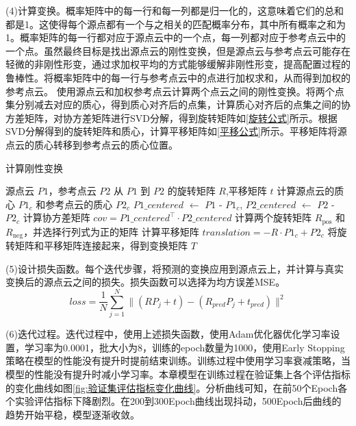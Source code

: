 (4)计算变换。概率矩阵中的每一行和每一列都是归一化的，这意味着它们的总和都是1。这使得每个源点都有一个与之相关的匹配概率分布，其中所有概率之和为1。概率矩阵的每一行都对应于源点云中的一个点，每一列都对应于参考点云中的一个点。虽然最终目标是找出源点云的刚性变换，但是源点云与参考点云可能存在轻微的非刚性形变，通过求加权平均的方式能够缓解非刚性形变，提高配置过程的鲁棒性。将概率矩阵中的每一行与参考点云中的点进行加权求和，从而得到加权的参考点云。
使用源点云和加权参考点云计算两个点云之间的刚性变换。将两个点集分别减去对应的质心，得到质心对齐后的点集，计算质心对齐后的点集之间的协方差矩阵，对协方差矩阵进行SVD分解\cite{kalman1996singularly}，得到旋转矩阵如\eqref{旋转公式}所示。根据SVD分解得到的旋转矩阵和质心，计算平移矩阵如\eqref{平移公式}所示。平移矩阵将源点云的质心转移到参考点云的质心位置。

\begin{algorithm}[htbp]
	\caption{计算刚性变换}
	\label{alg:compute_rigid_transform}
	\begin{algorithmic}[1]
		\Require 源点云 $P1$，参考点云 $P2$
		\Ensure 从 $P1$ 到 $P2$ 的旋转矩阵 $R$,平移矩阵 $t$
		\State 计算源点云的质心 $P1_c$ 和参考点云的质心 $P2_c$
		\State  $P1\_centered$ $\gets$  $P1$ -  $P1_c$, $P2\_centered$ $\gets$  $P2$ -  $P2_c$ 
		\State 计算协方差矩阵 $cov = P1\_centered^\top \cdot P2\_centered $
		\State 计算两个旋转矩阵 $R_{\text{pos}}$ 和 $R_{\text{neg}}$，并选择行列式为正的矩阵
	 \State 计算平移矩阵 $translation = -R \cdot P1_c + P2_c$
		\State 将旋转矩阵和平移矩阵连接起来，得到变换矩阵 $T$
	\end{algorithmic}
\end{algorithm}
(5)设计损失函数。每个迭代步骤，将预测的变换应用到源点云上，并计算与真实变换后的源点云之间的损失。损失函数可以选择为均方误差MSE。
\begin{equation}
	loss = \frac{1}{N}\sum_{j=1}^{N}\| (RP_j+t) - (R_{pred}P_j+t_{pred}) \|^2
\end{equation}
\par
(6)迭代过程。迭代过程中，使用上述损失函数，使用Adam优化器优化学习率设置，学习率为0.0001，批大小为8，训练的epoch数量为1000，使用Early Stopping策略在模型的性能没有提升时提前结束训练。训练过程中使用学习率衰减策略，当模型的性能没有提升时减小学习率。本章模型在训练过程在验证集上各个评估指标的变化曲线如图\ref{fig:验证集评估指标变化曲线}。分析曲线可知，在前50个Epoch各个实验评估指标下降剧烈。在200到300Epoch曲线出现抖动，500Epoch后曲线的趋势开始平稳，模型逐渐收敛。
